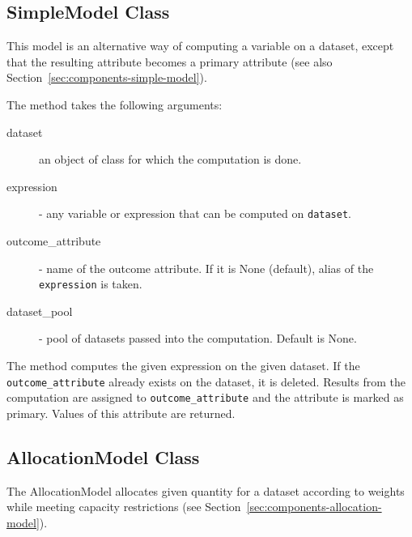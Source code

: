 \subsection{SimpleModel Class}
\label{sec:api-simple-model}
%
This model is an alternative way of computing a variable on a dataset, except that the resulting attribute 
becomes a primary attribute (see also Section~\ref{sec:components-simple-model}).

The  method takes the following arguments:
\begin{description}
\item[dataset] an object of class  for which the computation is done.
\item[expression] - any variable or expression that can be computed on \verb|dataset|.
\item[outcome_attribute] - name of the outcome attribute. If it is None (default), alias
of the \verb|expression| is taken.
\item[dataset_pool] - pool of datasets passed into the computation. Default is None.
\end{description}

The  method computes the given expression on the given dataset. If the \verb|outcome_attribute| already exists
on the dataset, it is deleted. Results from the computation are assigned to \verb|outcome_attribute| and 
the attribute is marked as primary. Values of this attribute are returned.

\subsection{AllocationModel Class}
\label{sec:api-allocation-model}
%
The AllocationModel allocates given quantity for a dataset according to weights while meeting capacity restrictions 
(see Section~\ref{sec:components-allocation-model}). 

